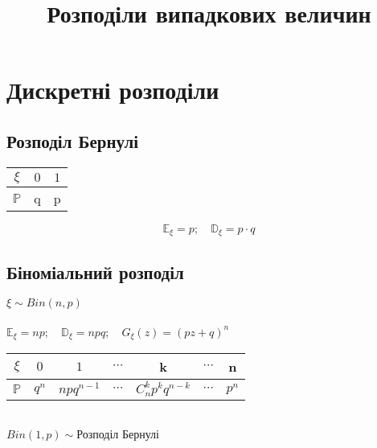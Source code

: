 \documentclass[16pt]{scrartcl}
\title{Розподіли випадкових величин}
\date{}
\begin{document}
\maketitle
\newpage

\section{Дискретні розподіли}
\subsection{Розподіл Бернулі}
\begin{multicols}{2}
    \begin{wraptable}{l}{0.5\linewidth}
    \begin{tabular}{c|c|c}
        $\xi$ & $0$ & $1$ \\\hline
        $\mathbb{P}$ & q & p
    \end{tabular}
    \end{wraptable}
    $$\mathbb{E}_\xi=p;\quad\mathbb{D}_\xi=p\cdot q$$
\end{multicols}

\subsection{Біноміальний розподіл}

$\xi\sim Bin(n,p)$\\\\
$\mathbb{E}_\xi=n p;\quad\mathbb{D}_\xi=n p q;\quad G_\xi(z)=(p z+q)^n$
\begin{table}[h]
    \begin{tabular}{c|c|c|c|c|c|c}
        $\xi$ & $0$ & $1$ & $\cdots$ & k & $\cdots$ & n \\\hline
        $\mathbb{P}$ & $q^n$ & $n p q^{n-1}$ & $\cdots$ & $C_n^k p^k q^{n-k}$ & $\cdots$ & $p^n$
    \end{tabular}
    \label{tab:my_label}
\end{table}\\
$Bin(1,p)\sim\texttt{Розподіл Бернулі}$

\newpage
\end{document}

